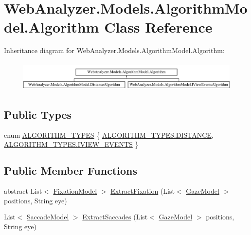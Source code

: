 \hypertarget{class_web_analyzer_1_1_models_1_1_algorithm_model_1_1_algorithm}{}\section{Web\+Analyzer.\+Models.\+Algorithm\+Model.\+Algorithm Class Reference}
\label{class_web_analyzer_1_1_models_1_1_algorithm_model_1_1_algorithm}
Inheritance diagram for Web\+Analyzer.\+Models.\+Algorithm\+Model.\+Algorithm\+:\begin{figure}[H]
\begin{center}
\leavevmode
\includegraphics[height=1.559888cm]{class_web_analyzer_1_1_models_1_1_algorithm_model_1_1_algorithm}
\end{center}
\end{figure}
\subsection*{Public Types}
\begin{DoxyCompactItemize}
\item 
enum \hyperlink{class_web_analyzer_1_1_models_1_1_algorithm_model_1_1_algorithm_a170e7786e033cbd0c09cabb30030794b}{A\+L\+G\+O\+R\+I\+T\+H\+M\+\_\+\+T\+Y\+P\+E\+S} \{ \hyperlink{class_web_analyzer_1_1_models_1_1_algorithm_model_1_1_algorithm_a170e7786e033cbd0c09cabb30030794bab06c2037eb7a58030a42212c8244d477}{A\+L\+G\+O\+R\+I\+T\+H\+M\+\_\+\+T\+Y\+P\+E\+S.\+D\+I\+S\+T\+A\+N\+C\+E}, 
\hyperlink{class_web_analyzer_1_1_models_1_1_algorithm_model_1_1_algorithm_a170e7786e033cbd0c09cabb30030794bac26c9f91b65d50d7c790272029d7dd49}{A\+L\+G\+O\+R\+I\+T\+H\+M\+\_\+\+T\+Y\+P\+E\+S.\+I\+V\+I\+E\+W\+\_\+\+E\+V\+E\+N\+T\+S}
 \}
\end{DoxyCompactItemize}
\subsection*{Public Member Functions}
\begin{DoxyCompactItemize}
\item 
abstract List$<$ \hyperlink{class_web_analyzer_1_1_models_1_1_analysis_model_1_1_fixation_model}{Fixation\+Model} $>$ \hyperlink{class_web_analyzer_1_1_models_1_1_algorithm_model_1_1_algorithm_aed9ae492d1851815f79d9b2f3361711e}{Extract\+Fixation} (List$<$ \hyperlink{class_web_analyzer_1_1_models_1_1_data_model_1_1_gaze_model}{Gaze\+Model} $>$ positions, String eye)
\item 
List$<$ \hyperlink{class_web_analyzer_1_1_models_1_1_analysis_model_1_1_saccade_model}{Saccade\+Model} $>$ \hyperlink{class_web_analyzer_1_1_models_1_1_algorithm_model_1_1_algorithm_ac6607203b63241b68e2e4180c97de9a0}{Extract\+Saccades} (List$<$ \hyperlink{class_web_analyzer_1_1_models_1_1_data_model_1_1_gaze_model}{Gaze\+Model} $>$ positions, String eye)
\end{DoxyCompactItemize}
